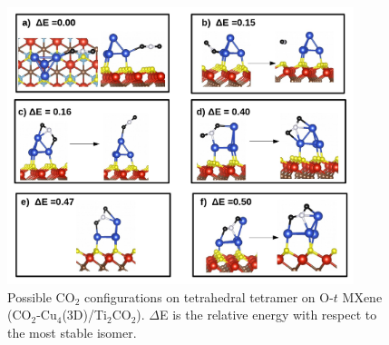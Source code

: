 \begin{figure}[htb]
  \begin{center}
    \includegraphics[width=0.9\textwidth]{./Appendix2/Appendix2_figures/photo15.jpg}
  \end{center}
   \caption{Possible CO$_2$ configurations on tetrahedral tetramer on O-$t$ MXene (CO$_2$-Cu$_4$(3D)/Ti$_2$CO$_2$). $\Delta$E is the relative energy with respect to the most stable isomer.}
  \label{fig-015}
\end{figure}

%
